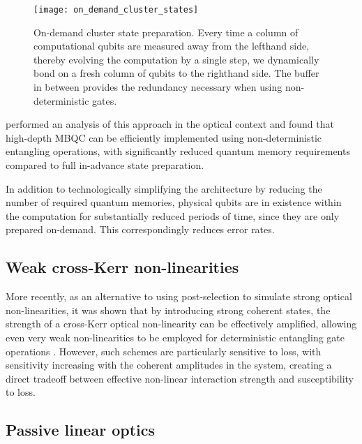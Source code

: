 \begin{figure}[htpb]
\texttt{[image: on\_demand\_cluster\_states]}
\caption{On-demand cluster state preparation. Every time a column of computational qubits are measured away from the lefthand side, thereby evolving the computation by a single step, we dynamically bond on a fresh column of qubits to the righthand side. The buffer in between provides the redundancy necessary when using non-deterministic gates.}\label{fig:on_demand_cs}
\end{figure}

\cite{KokBuffer} performed an analysis of this approach in the optical context and found that high-depth MBQC can be efficiently implemented using non-deterministic entangling operations, with significantly reduced quantum memory requirements compared to full in-advance state preparation.

In addition to technologically simplifying the architecture by reducing the number of required quantum memories, physical qubits are in existence within the computation for substantially reduced periods of time, since they are only prepared on-demand. This correspondingly reduces error rates.


%
%

\subsection{Weak cross-Kerr non-linearities} 

More recently, as an alternative to using post-selection to simulate strong optical non-linearities, it was shown that by introducing strong coherent states, the strength of a cross-Kerr optical non-linearity can be effectively amplified, allowing even very weak non-linearities to be employed for deterministic entangling gate operations \cite{bib:Munro05}. However, such schemes are particularly sensitive to loss, with sensitivity increasing with the coherent amplitudes in the system, creating a direct tradeoff between effective non-linear interaction strength and susceptibility to loss.


%
%

\subsection{Passive linear optics} \label{sec:passive_LO} 

